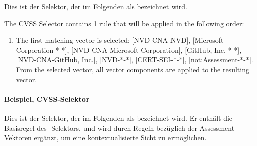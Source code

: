 Dies ist der Selektor, der im Folgenden als  bezeichnet wird.

\noindent The CVSS Selector contains 1 rule that will be applied in the following order:
\begin{enumerate}[noitemsep]
    \item The first matching vector is selected: [NVD-CNA-NVD], [Microsoft Corporation-*-*], [NVD-CNA-Microsoft Corporation], [GitHub, Inc.-*-*], [NVD-CNA-GitHub, Inc.], [NVD-*-*], [CERT-SEI-*-*], [not:Assessment-*-*]. From the selected vector, all vector components are applied to the resulting vector.
\end{enumerate}

\paragraph{Beispiel, CVSS-Selektor } \label{par:projektbericht-loesungsweg-cvss-selection-example-selector-context}

Dies ist der Selektor, der im Folgenden als  bezeichnet wird.
Er enthält die Basisregel des -Selektors, und wird durch Regeln bezüglich der Assessment-Vektoren ergänzt, um eine kontextualisierte Sicht zu ermöglichen.

